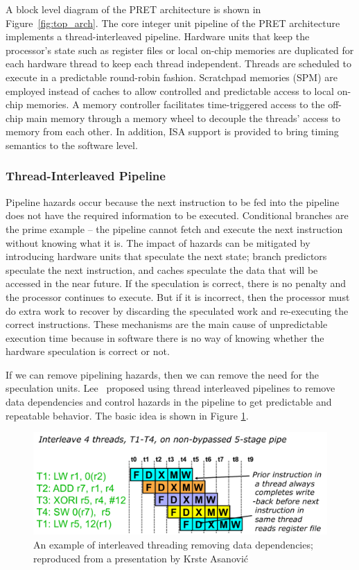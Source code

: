 \documentclass[times, 10pt,twocolumn]{article}
\begin{document}
A block level diagram of the PRET architecture is shown in Figure~\ref{fig:top_arch}. The core integer unit pipeline of the PRET architecture implements a thread-interleaved pipeline. Hardware units that keep the processor's state such as register files or local on-chip memories are duplicated for each hardware thread to keep each thread independent. Threads are scheduled to execute in a predictable round-robin fashion. Scratchpad memories (SPM)\cite{Banakar2002} are employed instead of caches to allow controlled and predictable access to local on-chip memories. A memory controller facilitates time-triggered access to the off-chip main memory through a memory wheel to decouple the threads' access to memory from each other. In addition, ISA support is provided to bring timing semantics to the software level.

\subsubsection {Thread-Interleaved Pipeline}
Pipeline hazards occur because the next instruction to be fed into the pipeline does not have the required information to be executed. Conditional branches are the prime example -- the pipeline cannot fetch and execute the next instruction without knowing what it is. The impact of hazards can be mitigated by introducing hardware units that speculate the next state; branch predictors speculate the next instruction, and caches speculate the data that will be accessed in the near future. If the speculation is correct, there is no penalty and the processor continues to execute. But if it is incorrect, then the processor must do extra work to recover by discarding the speculated work and re-executing the correct instructions. These mechanisms are the main cause of unpredictable execution time because in software there is no way of knowing whether the hardware speculation is correct or not. 

If we can remove pipelining hazards, then we can remove the need for the speculation units. Lee~\cite{lee1987pipeline1} proposed using thread interleaved pipelines to remove data dependencies and control hazards in the pipeline to get predictable and repeatable behavior. The basic idea is shown in Figure \ref{fig:int_pipe}. 
\begin{figure}[ht]
  \centering
  \includegraphics[scale=.35]{./images/interleavedpipeline.pdf}
  \caption{An example of interleaved threading removing data dependencies; reproduced from a presentation by Krste Asanovi\'{c}}
  \label{fig:int_pipe}
\end{figure}
\end{document}

